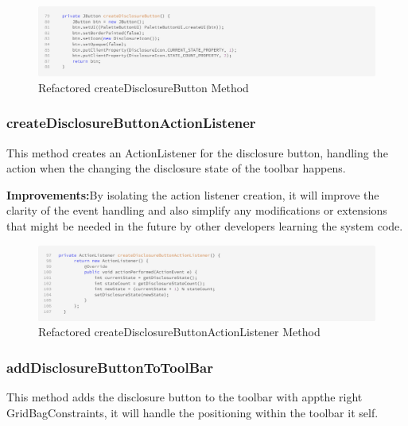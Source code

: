 \begin{figure}[H]
    \centering
    \includegraphics[width=\linewidth]{pic/F createDisclosureButton.png}
    \caption{Refactored createDisclosureButton Method}
    \label{fig:Refactored createDisclosureButton Method}
\end{figure}





\subsubsection{createDisclosureButtonActionListener}
This method creates an ActionListener for the disclosure button, handling the action when the changing the disclosure state of the toolbar happens.

\textbf{Improvements:}By isolating the action listener creation, it will improve the clarity of the event handling
and also simplify any modifications or extensions that might be needed in the future by other developers learning the system code.

\begin{figure}[H]
    \centering
    \includegraphics[width=\linewidth]{pic/F createDisclosureButtonActionListener.png}
    \caption{Refactored createDisclosureButtonActionListener Method}
    \label{fig:Refactored createDisclosureButtonActionListener Method}
\end{figure}



\subsubsection{addDisclosureButtonToToolBar}
This method adds the disclosure button to the toolbar with appthe right GridBagConstraints, it will handle the positioning within the toolbar it self.

